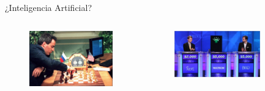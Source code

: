 \documentclass[10pt]{beamer}
\begin{document}
\begin{frame}{¿Inteligencia Artificial?}

    \begin{columns}
        \begin{column}{0.32\textwidth}
            \begin{figure}[!h] 
                \centering
                \includegraphics[width=1\textwidth]{img/deepblue}
            \end{figure}                
        \end{column}
        \begin{column}{0.32\textwidth}
            \begin{figure}[!h] 
                \centering
                \includegraphics[width=1\textwidth]{img/watson}
            \end{figure}                
        \end{column}
        \begin{column}{0.32\textwidth}
            \begin{figure}[!h] 

\end{figure}
\end{column}
\end{columns}
\end{frame}
\end{document}
